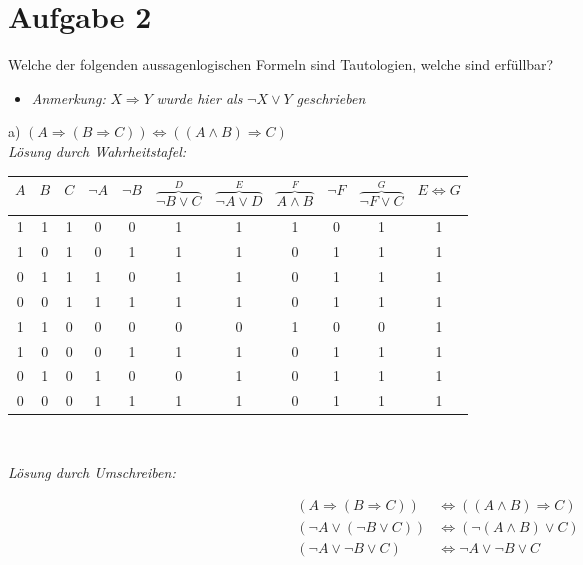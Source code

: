 \section*{Aufgabe 2}

Welche der folgenden aussagenlogischen Formeln sind Tautologien, welche sind erfüllbar?\\

\begin{itemize}[leftmargin=*]
\item \textit{Anmerkung:} $X \Rightarrow Y$ \textit{wurde hier als} $\lnot X \lor Y$ \textit{geschrieben}
\end{itemize}

a) $(A \Rightarrow (B \Rightarrow C)) \Leftrightarrow ((A \land B) \Rightarrow C)$\\

\textit{Lösung durch Wahrheitstafel:}

\begin{table}[h]
\centering
\begin{tabular}{c|c|c|c|c|c|c|c|c|c|c}
$A$ & $B$ & $C$ & $\lnot A$ & $\lnot B$ & $\overbrace{\lnot B \lor C}^{D}$ & $\overbrace{\lnot A \lor D}^{E}$ & $\overbrace{A \land B}^{F}$ & $\lnot F$ & $\overbrace{\lnot F \lor C}^{G}$ & $E \Leftrightarrow G$\\
\hline
1 & 1 & 1 & 0 & 0 & 1 & 1 & 1 & 0 & 1 & 1\\
1 & 0 & 1 & 0 & 1 & 1 & 1 & 0 & 1 & 1 & 1\\
0 & 1 & 1 & 1 & 0 & 1 & 1 & 0 & 1 & 1 & 1\\
0 & 0 & 1 & 1 & 1 & 1 & 1 & 0 & 1 & 1 & 1\\
1 & 1 & 0 & 0 & 0 & 0 & 0 & 1 & 0 & 0 & 1\\
1 & 0 & 0 & 0 & 1 & 1 & 1 & 0 & 1 & 1 & 1\\
0 & 1 & 0 & 1 & 0 & 0 & 1 & 0 & 1 & 1 & 1\\
0 & 0 & 0 & 1 & 1 & 1 & 1 & 0 & 1 & 1 & 1
\end{tabular}
\end{table}\

\textit{Lösung durch Umschreiben:}

\begin{align*}
(A \Rightarrow (B \Rightarrow C)) &\Leftrightarrow ((A \land B) \Rightarrow C)\\
(\lnot A \lor (\lnot B \lor C)) &\Leftrightarrow (\lnot (A \land B) \lor C)\\
(\lnot A \lor \lnot B \lor C) &\Leftrightarrow \lnot A \lor \lnot B \lor C
\end{align*}\

